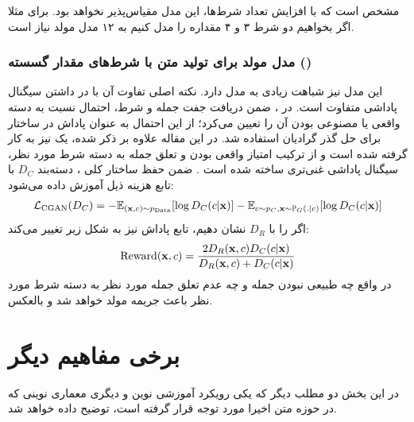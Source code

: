 مشخص است که با افزایش تعداد شرط‌ها، این مدل مقیاس‌پذیر نخواهد بود. برای مثلا اگر بخواهیم دو شرط ۳ و ۴ مقداره را مدل کنیم به ۱۲ مدل مولد نیاز است.
\subsubsection{
    مدل مولد برای تولید متن با شرط‌های مقدار گسسته
()\protect{}}
این مدل نیز شباهت زیادی به مدل \cgan{} دارد. نکته اصلی تفاوت آن با \cgan{} در داشتن سیگنال پاداشی متفاوت است. در \cgan{}،
\discriminator{}
ضمن دریافت جفت جمله و شرط، احتمال نسبت به دسته واقعی یا مصنوعی بودن آن را تعیین می‌کرد؛ از این احتمال به عنوان پاداش در ساختار \reinforce{} برای حل گذر گرادیان استفاده شد. در این مقاله علاوه بر \discriminator{} ذکر شده، یک \classifier{} نیز به کار گرفته شده است و از ترکیب امتیاز واقعی بودن و تعلق جمله به دسته شرط مورد نظر، سیگنال پاداشی غنی‌تری ساخته شده است \cite{csgan}. ضمن حفظ ساختار کلی \cgan{}، دسته‌بند $D_C$ با تابع هزینه ذیل آموزش داده می‌شود:
\begin{align}
	{\mathcal{L}}_\text{CGAN} (D_C) =
	-\mathbb E_{({\bf x}, c) \sim p_\text{Data}} [\log D_C(c|{\bf x})]
	-\mathbb E_{c \sim p_C, {\bf x} \sim \mathbb P_G(.|c)} [\log D_C(c|{\bf x})]
\end{align}
اگر \discriminator{} را با $D_R$ نشان دهیم، تابع پاداش نیز به شکل زیر تغییر می‌کند:
\begin{align}
	\text{Reward} ({\bf x}, c) =
	\frac{2 D_R({\bf x},c)D_C(c|{\bf x})}
	{D_R({\bf x},c) + D_C(c|{\bf x})}
\end{align}
در واقع چه طبیعی نبودن جمله و چه عدم تعلق جمله مورد نظر به دسته شرط مورد نظر باعث جریمه مولد خواهد شد و بالعکس.

\section{برخی مفاهیم دیگر}
در این بخش دو مطلب دیگر که یکی رویکرد آموزشی نوین و دیگری معماری نوینی که در حوزه متن اخیرا مورد توجه قرار گرفته است، توضیح داده خواهد شد.
